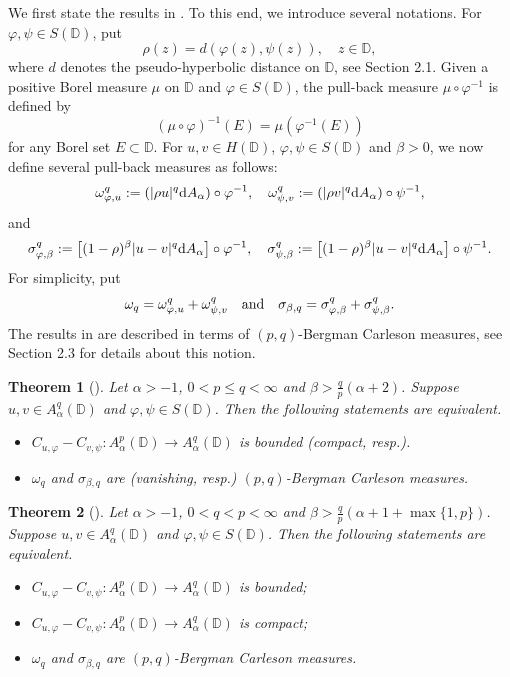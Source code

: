 \documentclass[preprint,12pt,times]{elsarticle}
\newtheorem{theorem}{Theorem}[section]
\theoremstyle{definition}
\theoremstyle{remark}
\numberwithin{equation}{section}
\begin{document}
We first state the results in \cite{5}. To this end, we introduce several notations. For $\varphi,\psi\in S(\mathbb{D})$, put
\[\rho(z)=d(\varphi(z),\psi(z)),\quad z\in\mathbb{D},\]
where $d$ denotes the pseudo-hyperbolic distance on $\mathbb{D}$, see Section 2.1. Given a positive Borel measure $\mu$ on $\mathbb{D}$ and $\varphi\in S(\mathbb{D})$, the pull-back measure $\mu\circ\varphi^{-1}$ is defined by 
\[(\mu\circ\varphi)^{-1}(E)=\mu(\varphi^{-1}(E))\]
for any Borel set $E\subset\mathbb{D}$. For $u,v\in H(\mathbb{D})$, $\varphi,\psi\in S(\mathbb{D})$ and $\beta>0$, we now define several pull-back measures as follows:
\begin{align*}
\omega_{\varphi,u}^q:=\left(|\rho u|^q{\rm d}A_{\alpha}\right)\circ\varphi^{-1},\quad \omega_{\psi,v}^q:=\left(|\rho v|^q{\rm d}A_{\alpha}\right)\circ\psi^{-1},
\end{align*}
and
\begin{align*}
\sigma_{\varphi,\beta}^q:=\left[(1-\rho)^{\beta}|u-v|^q{\rm d}A_{\alpha}\right]\circ\varphi^{-1},\quad \sigma_{\psi,\beta}^q:=\left[(1-\rho)^{\beta}|u-v|^q{\rm d}A_{\alpha}\right]\circ\psi^{-1}.
\end{align*}
For simplicity, put
\[\omega_q=\omega_{\varphi,u}^q+\omega_{\psi,v}^q\quad {\rm and }\quad \sigma_{\beta,q}=\sigma_{\varphi,\beta}^q+\sigma_{\psi,\beta}^q.\]
The results in \cite{5} are described in terms of $(p,q)$-Bergman Carleson measures, see Section 2.3 for details about this notion.

\begin{theorem}[\cite{5}]\label{theorem1.1}
Let $\alpha>-1$, $0<p\leq q<\infty$ and $\beta>\frac{q}{p}(\alpha+2)$. Suppose $u,v\in A_{\alpha}^q(\mathbb{D})$ and $\varphi,\psi\in S(\mathbb{D})$. Then the following statements are equivalent.
\begin{itemize}
\item[(i)] $C_{u,\varphi}-C_{v,\psi}: A_{\alpha}^p(\mathbb{D})\to A_{\alpha}^q(\mathbb{D})$ is bounded (compact, resp.).
\item[(ii)] $\omega_q$ and $\sigma_{\beta,q}$ are (vanishing, resp.) $(p,q)$-Bergman Carleson measures.  
\end{itemize}
\end{theorem}

\begin{theorem}[\cite{5}]\label{theorem1.2}
Let $\alpha>-1$, $0<q<p<\infty$ and $\beta>\frac{q}{p}(\alpha+1+\max\{1,p\})$. Suppose $u,v\in A_{\alpha}^q(\mathbb{D})$ and $\varphi,\psi\in S(\mathbb{D})$. Then the following statements are equivalent.
\begin{itemize}
\item[(i)] $C_{u,\varphi}-C_{v,\psi}:A_{\alpha}^p(\mathbb{D})\to A_{\alpha}^q(\mathbb{D})$ is bounded;
\item[(ii)] $C_{u,\varphi}-C_{v,\psi}: A_{\alpha}^p(\mathbb{D})\to A_{\alpha}^q(\mathbb{D})$ is compact;
\item[(iii)] $\omega_q$ and $\sigma_{\beta,q}$ are $(p,q)$-Bergman Carleson measures.
\end{itemize}
\end{theorem}
\end{document}
